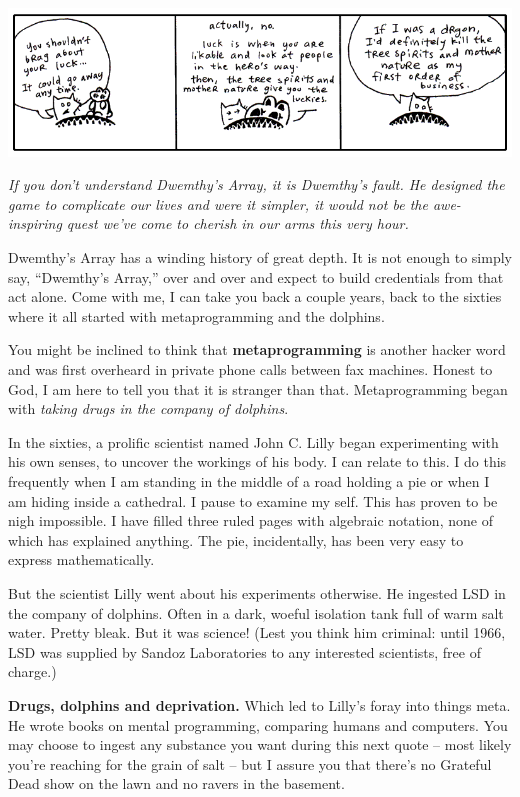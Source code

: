 \documentclass[10pt,twoside]{report}
\begin{document}
	\includegraphics[width=1.0\textwidth]{cache/63.png}

{\em If you don't understand Dwemthy's Array, it is Dwemthy's
  fault. He designed the game to complicate our lives and were it
  simpler, it would not be the awe-inspiring quest we've come to
  cherish in our arms this very hour.}

Dwemthy's Array has a winding history of great depth.  It is not
enough to simply say, ``Dwemthy's Array,'' over and over and expect to
build credentials from that act alone.  Come with me, I can take you
back a couple years, back to the sixties where it all started with
metaprogramming and the dolphins.

You might be inclined to think that {\bf metaprogramming} is another
hacker word and was first overheard in private phone calls between fax
machines.  Honest to God, I am here to tell you that it is stranger
than that. Metaprogramming began with {\em taking drugs in the company
  of dolphins}.

In the sixties, a prolific scientist named John C. Lilly began
experimenting with his own senses, to uncover the workings of his
body.  I can relate to this.  I do this frequently when I am standing
in the middle of a road holding a pie or when I am hiding inside a
cathedral.  I pause to examine my self.  This has proven to be nigh
impossible.  I have filled three ruled pages with algebraic notation,
none of which has explained anything.  The pie, incidentally, has been
very easy to express mathematically.

But the scientist Lilly went about his experiments otherwise.  He
ingested LSD in the company of dolphins. Often in a dark, woeful
isolation tank full of warm salt water.  Pretty bleak.  But it was
science!  (Lest you think him criminal: until 1966, LSD was supplied
by Sandoz Laboratories to any interested scientists, free of charge.)

{\bf Drugs, dolphins and deprivation.}  Which led to Lilly's foray
into things meta.  He wrote books on mental programming, comparing
humans and computers.  You may choose to ingest any substance you want
during this next quote -- most likely you're reaching for the grain of
salt -- but I assure you that there's no Grateful Dead show on the
lawn and no ravers in the basement.
\end{document}
